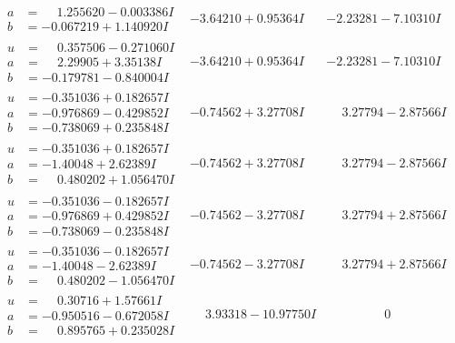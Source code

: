 \documentclass[1p]{elsarticle_modified}
\theoremstyle{definition}
\begin{document}
$$\begin{array}{c|c|c}
\begin{aligned}
a &= \phantom{-}1.255620 - 0.003386 I \\
b &= -0.067219 + 1.140920 I\end{aligned}
 & -3.64210 + 0.95364 I & -2.23281 - 7.10310 I \\ \hline\begin{aligned}
u &= \phantom{-}0.357506 - 0.271060 I \\
a &= \phantom{-}2.29905 + 3.35138 I \\
b &= -0.179781 - 0.840004 I\end{aligned}
 & -3.64210 + 0.95364 I & -2.23281 - 7.10310 I \\ \hline\begin{aligned}
u &= -0.351036 + 0.182657 I \\
a &= -0.976869 - 0.429852 I \\
b &= -0.738069 + 0.235848 I\end{aligned}
 & -0.74562 + 3.27708 I & \phantom{-}3.27794 - 2.87566 I \\ \hline\begin{aligned}
u &= -0.351036 + 0.182657 I \\
a &= -1.40048 + 2.62389 I \\
b &= \phantom{-}0.480202 + 1.056470 I\end{aligned}
 & -0.74562 + 3.27708 I & \phantom{-}3.27794 - 2.87566 I \\ \hline\begin{aligned}
u &= -0.351036 - 0.182657 I \\
a &= -0.976869 + 0.429852 I \\
b &= -0.738069 - 0.235848 I\end{aligned}
 & -0.74562 - 3.27708 I & \phantom{-}3.27794 + 2.87566 I \\ \hline\begin{aligned}
u &= -0.351036 - 0.182657 I \\
a &= -1.40048 - 2.62389 I \\
b &= \phantom{-}0.480202 - 1.056470 I\end{aligned}
 & -0.74562 - 3.27708 I & \phantom{-}3.27794 + 2.87566 I \\ \hline\begin{aligned}
u &= \phantom{-}0.30716 + 1.57661 I \\
a &= -0.950516 - 0.672058 I \\
b &= \phantom{-}0.895765 + 0.235028 I\end{aligned}
 & \phantom{-}3.93318 - 10.97750 I & \phantom{-0.000000 } 0 \\ \hline\begin{aligned}

\end{aligned}
\end{array}$$
\end{document}
